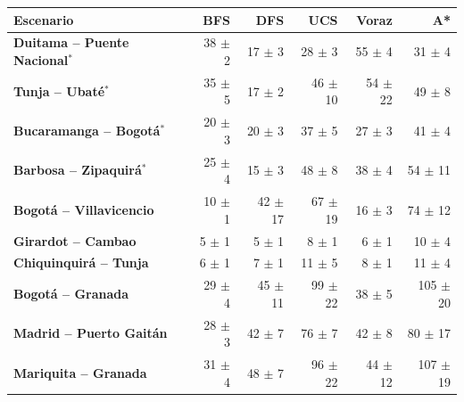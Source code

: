 \renewcommand{\arraystretch}{1.2}
\begin{tabular}{|l|r|r|r|r|r|}
\hline
\rowcolor{gray!20} \textbf{Escenario} & \textbf{BFS} & \textbf{DFS} & \textbf{UCS} & \textbf{Voraz} & \textbf{A*} \\
\hline
\textbf{Duitama -- Puente Nacional$^{*}$} & 38 $\pm$ 2 & 17 $\pm$ 3 & 28 $\pm$ 3 & 55 $\pm$ 4 & 31 $\pm$ 4 \\
\hline
\textbf{Tunja -- Ubaté$^{*}$} & 35 $\pm$ 5 & 17 $\pm$ 2 & 46 $\pm$ 10 & 54 $\pm$ 22 & 49 $\pm$ 8 \\
\hline
\textbf{Bucaramanga -- Bogotá$^{*}$} & 20 $\pm$ 3 & 20 $\pm$ 3 & 37 $\pm$ 5 & 27 $\pm$ 3 & 41 $\pm$ 4 \\
\hline
\textbf{Barbosa -- Zipaquirá$^{*}$} & 25 $\pm$ 4 & 15 $\pm$ 3 & 48 $\pm$ 8 & 38 $\pm$ 4 & 54 $\pm$ 11 \\
\hline
\textbf{Bogotá -- Villavicencio} & 10 $\pm$ 1 & 42 $\pm$ 17 & 67 $\pm$ 19 & 16 $\pm$ 3 & 74 $\pm$ 12 \\
\hline
\textbf{Girardot -- Cambao} & 5 $\pm$ 1 & 5 $\pm$ 1 & 8 $\pm$ 1 & 6 $\pm$ 1 & 10 $\pm$ 4 \\
\hline
\textbf{Chiquinquirá -- Tunja} & 6 $\pm$ 1 & 7 $\pm$ 1 & 11 $\pm$ 5 & 8 $\pm$ 1 & 11 $\pm$ 4 \\
\hline
\textbf{Bogotá -- Granada} & 29 $\pm$ 4 & 45 $\pm$ 11 & 99 $\pm$ 22 & 38 $\pm$ 5 & 105 $\pm$ 20 \\
\hline
\textbf{Madrid -- Puerto Gaitán} & 28 $\pm$ 3 & 42 $\pm$ 7 & 76 $\pm$ 7 & 42 $\pm$ 8 & 80 $\pm$ 17 \\
\hline
\textbf{Mariquita -- Granada} & 31 $\pm$ 4 & 48 $\pm$ 7 & 96 $\pm$ 22 & 44 $\pm$ 12 & 107 $\pm$ 19 \\
\hline
\end{tabular}
